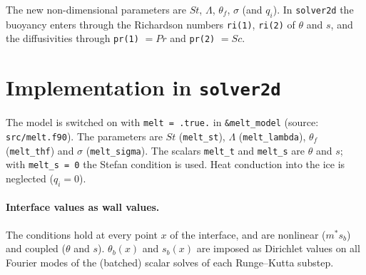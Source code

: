 \documentclass[11pt,a4paper]{article}
\begin{document}
The new non-dimensional parameters are $St$, $\Lambda$, $\theta_f$, $\sigma$ (and $q_i$). In
\texttt{solver2d} the buoyancy enters through the Richardson numbers \texttt{ri(1)}, \texttt{ri(2)}
of $\theta$ and $s$, and the diffusivities through \texttt{pr(1)} $=Pr$ and \texttt{pr(2)} $=Sc$.

\section{Implementation in \texttt{solver2d}}

The model is switched on with \texttt{melt = .true.} in \texttt{\&melt\_model} (source:
\texttt{src/melt.f90}). The parameters are $St$ (\texttt{melt\_st}), $\Lambda$ (\texttt{melt\_lambda}),
$\theta_f$ (\texttt{melt\_thf}) and $\sigma$ (\texttt{melt\_sigma}). The scalars \texttt{melt\_t} and
\texttt{melt\_s} are $\theta$ and $s$; with \texttt{melt\_s = 0} the Stefan condition is used. Heat
conduction into the ice is neglected ($q_i=0$).

\paragraph{Interface values as wall values.} The conditions hold at every point $x$ of the interface,
and are nonlinear ($m^* s_b$) and coupled ($\theta$ and $s$). $\theta_b(x)$ and $s_b(x)$ are imposed as
Dirichlet values on all Fourier modes of the (batched) scalar solves of each Runge--Kutta substep.
\end{document}
